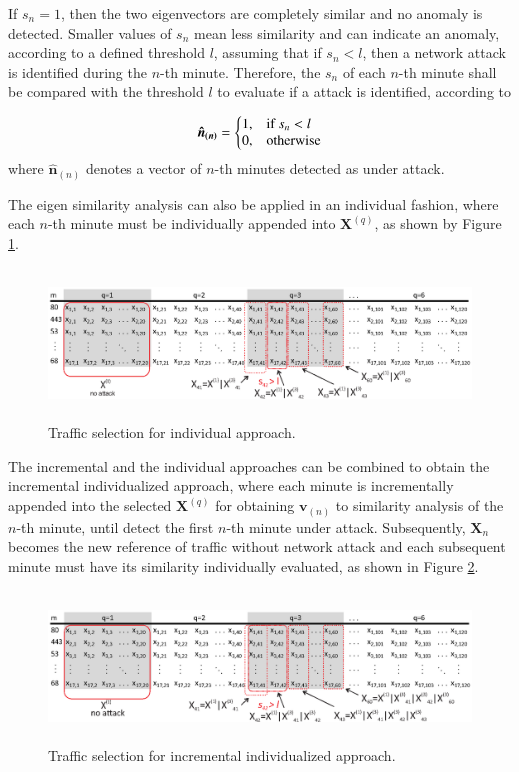 \documentclass[review]{elsarticle}
\begin{document}
If $s_n = 1$, then the two eigenvectors are completely similar and no anomaly is detected. Smaller values of $s_n$ mean less similarity and can indicate an anomaly, according to a defined 
threshold $l$, assuming that if $s_n < l$, then a network attack is identified during the $n$-th minute. Therefore, the $s_n$ of each $n$-th minute shall be compared with the threshold $l$ to evaluate if a attack is identified, according to

\begin{equation}\label{eq:eq14}
  \boldsymbol{\hat{n}_{(n)}}=\left\{
  \begin{array}{@{}ll@{}}
    1, & \text{if}\ s_n < l \\
    0, & \text{otherwise}
  \end{array}\right.
\end{equation}
where $\boldsymbol{\hat{n}}_{(n)}$ denotes a vector of $n$-th minutes detected as under attack.

The eigen similarity analysis can also be applied in an individual fashion, where each $n$-th minute must be individually appended into $\boldsymbol{X}^{(q)}$, as shown by Figure \ref{fig:fig9}.

\begin{figure}[h!]
     \includegraphics[height=4cm, width=12.4cm]{results/figures/individualized.eps}
     \caption{Traffic selection for individual approach.}
     \label{fig:fig9}
\end{figure}

The incremental and the individual approaches can be combined to obtain the incremental individualized approach, where each minute is incrementally appended into the selected $\boldsymbol{X}^{(q)}$ for obtaining $\boldsymbol{v}_{(n)}$ to similarity analysis of the $n$-th minute, until detect the first $n$-th minute under attack. Subsequently, $\boldsymbol{X}_n$ becomes the new reference of traffic without network attack and each subsequent minute must have its similarity individually evaluated, as shown in Figure \ref{fig:fig2}.

\begin{figure}[h!]
     \includegraphics[height=4cm, width=12.4cm]{results/figures/incremental_individualized.eps}
     \caption{Traffic selection for incremental individualized approach.}
     \label{fig:fig2}
\end{figure}
\end{document}
